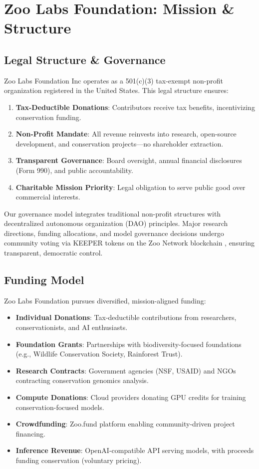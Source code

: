 \section{Zoo Labs Foundation: Mission \& Structure}


\subsection{Legal Structure \& Governance}

Zoo Labs Foundation Inc operates as a 501(c)(3) tax-exempt non-profit organization registered in the United States. This legal structure ensures:

\begin{enumerate}
    \item \textbf{Tax-Deductible Donations}: Contributors receive tax benefits, incentivizing conservation funding.
    \item \textbf{Non-Profit Mandate}: All revenue reinvests into research, open-source development, and conservation projects—no shareholder extraction.
    \item \textbf{Transparent Governance}: Board oversight, annual financial disclosures (Form 990), and public accountability.
    \item \textbf{Charitable Mission Priority}: Legal obligation to serve public good over commercial interests.
\end{enumerate}

Our governance model integrates traditional non-profit structures with decentralized autonomous organization (DAO) principles. Major research directions, funding allocations, and model governance decisions undergo community voting via KEEPER tokens on the Zoo Network blockchain \citep{zoo2024whitepaper}, ensuring transparent, democratic control.

\subsection{Funding Model}

Zoo Labs Foundation pursues diversified, mission-aligned funding:

\begin{itemize}
    \item \textbf{Individual Donations}: Tax-deductible contributions from researchers, conservationists, and AI enthusiasts.
    \item \textbf{Foundation Grants}: Partnerships with biodiversity-focused foundations (e.g., Wildlife Conservation Society, Rainforest Trust).
    \item \textbf{Research Contracts}: Government agencies (NSF, USAID) and NGOs contracting conservation genomics analysis.
    \item \textbf{Compute Donations}: Cloud providers donating GPU credits for training conservation-focused models.
    \item \textbf{Crowdfunding}: Zoo.fund platform enabling community-driven project financing.
    \item \textbf{Inference Revenue}: OpenAI-compatible API serving models, with proceeds funding conservation (voluntary pricing).
\end{itemize}

